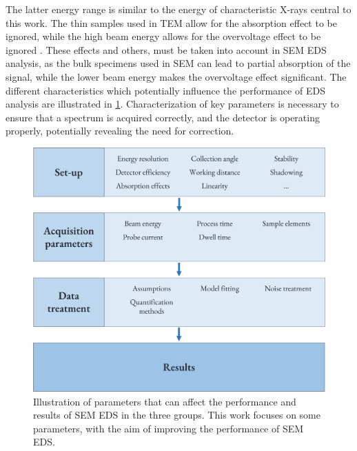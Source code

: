 The latter energy range is similar to the energy of characteristic X-rays central to this work.
The thin samples used in TEM allow for the absorption effect to be ignored, while the high beam energy allows for the overvoltage effect to be ignored \cite{carter2016transmission}.
These effects and others, must be taken into account in SEM EDS analysis, as the bulk specimens used in SEM can lead to partial absorption of the signal, while the lower beam energy makes the overvoltage effect significant.
The different characteristics which potentially influence the performance of EDS analysis are illustrated in \cref{fig:parameters}.
Characterization of key parameters is necessary to ensure that a spectrum is acquired correctly, and the detector is operating properly, potentially revealing the need for correction.


\begin{figure}[ht]
    \centering
    \includegraphics[width=0.8\linewidth]{figures/intro_parameters.png}
    \caption{
        Illustration of parameters that can affect the performance and results of SEM EDS in the three groups.
        This work focuses on some parameters, with the aim of improving the performance of SEM EDS.
    }
    \label{fig:parameters}
\end{figure}






